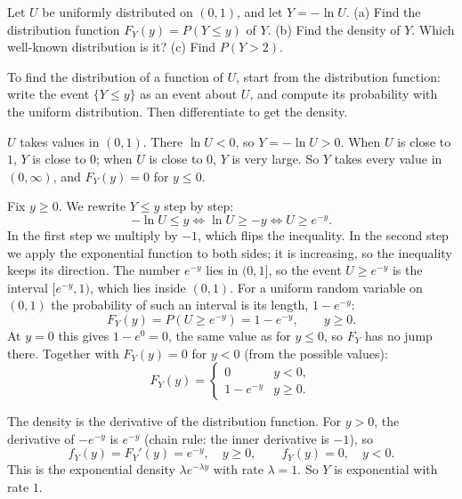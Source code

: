 
\begin{problem}
	Let $U$ be uniformly distributed on $(0,1)$, and let $Y=-\ln U$.
	(a) Find the distribution function $F_Y(y)=P(Y\le y)$ of $Y$.
	(b) Find the density of $Y$. Which well-known distribution is it?
	(c) Find $P(Y>2)$.
\end{problem}

\begin{solution}
	\idea To find the distribution of a function of $U$, start from the
	distribution function: write the event $\{Y\le y\}$ as an event about $U$,
	and compute its probability with the uniform distribution. Then
	differentiate to get the density.

	 $U$ takes values in $(0,1)$. There $\ln U<0$, so
	$Y=-\ln U>0$. When $U$ is close to $1$, $Y$ is close to $0$; when $U$ is
	close to $0$, $Y$ is very large. So $Y$ takes every value in $(0,\infty)$,
	and $F_Y(y)=0$ for $y\le 0$.

	 Fix $y\ge 0$. We rewrite $Y\le y$ step by step:
	\[
		-\ln U\le y
		\iff \ln U\ge -y
		\iff U\ge e^{-y}.
	\]
	In the first step we multiply by $-1$, which flips the inequality. In the
	second step we apply the exponential function to both sides; it is
	increasing, so the inequality keeps its direction. The number $e^{-y}$ lies
	in $(0,1]$, so the event $U\ge e^{-y}$ is the interval $[e^{-y},1)$, which
	lies inside $(0,1)$. For a uniform random variable on $(0,1)$ the
	probability of such an interval is its length, $1-e^{-y}$:
	\[
		F_Y(y)=P(U\ge e^{-y})=1-e^{-y},\qquad y\ge 0.
	\]
	At $y=0$ this gives $1-e^{0}=0$, the same value as for $y\le 0$, so $F_Y$
	has no jump there. Together with $F_Y(y)=0$ for $y<0$ (from the possible
	values):
	\[
		F_Y(y)=\begin{cases}
			0          & y<0,     \\
			1-e^{-y}   & y\ge 0.
		\end{cases}
	\]

	 The density is the derivative of the distribution function. For
	$y>0$, the derivative of $-e^{-y}$ is $e^{-y}$ (chain rule: the inner
	derivative is $-1$), so
	\[
		f_Y(y)=F_Y'(y)=e^{-y},\quad y\ge 0,\qquad f_Y(y)=0,\quad y<0.
	\]
	This is the exponential density $\lambda e^{-\lambda y}$ with rate
	$\lambda=1$. So $Y$ is exponential with rate $1$.


\end{solution}
